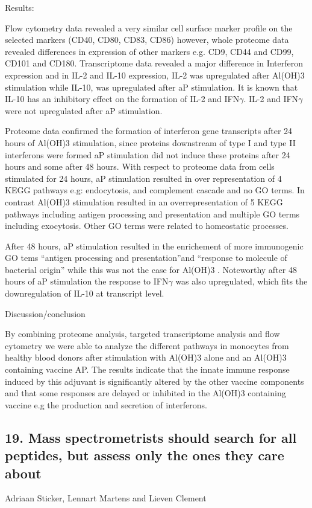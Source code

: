 Results:

Flow cytometry data revealed a very similar cell surface marker profile on the selected markers (CD40, CD80, CD83, CD86) however, whole proteome data revealed differences in expression of other markers e.g. CD9, CD44 and CD99, CD101 and CD180. Transcriptome data revealed a major difference in Interferon expression and in IL-2 and IL-10 expression, IL-2 was upregulated after Al(OH)3 stimulation while IL-10, was upregulated after aP stimulation. It is known that IL-10 has an inhibitory effect on the formation of IL-2 and IFN$\gamma$. IL-2 and IFN$\gamma$ were not upregulated after aP stimulation.

Proteome data confirmed the formation of interferon gene transcripts after 24 hours of Al(OH)3 stimulation, since proteins downstream of type I and type II interferons were formed aP stimulation did not induce these proteins after 24 hours and some after 48 hours. With respect to proteome data from cells stimulated for 24 hours, aP stimulation resulted in over representation of 4 KEGG pathways e.g: endocytosis, and complement cascade and no GO terms. In contrast Al(OH)3 stimulation resulted in an overrepresentation of 5 KEGG pathways including antigen processing and presentation and multiple GO terms including exocytosis. Other GO terms were related to homeostatic processes.

After 48 hours, aP stimulation resulted in the enrichement of more immunogenic GO tems “antigen processing and presentation”and “response to molecule of bacterial origin” while this was not the case for Al(OH)3 . Noteworthy after 48 hours of aP stimulation the response to IFN$\gamma$ was also upregulated, which fits the downregulation of IL-10 at transcript level.


Discussion/conclusion

By combining proteome analysis, targeted transcriptome analysis and flow cytometry we were able to analyze the different pathways in monocytes from healthy blood donors after stimulation with Al(OH)3 alone and an Al(OH)3 containing vaccine AP. The results indicate that the innate immune response induced by this adjuvant is significantly altered by the other vaccine components and that some responses are delayed or inhibited in the Al(OH)3 containing vaccine e.g the production and secretion of interferons.

\subsection*{\color{eubicRed} 19. Mass spectrometrists should search for all peptides, but assess only the ones they care about}
{\color{eubicGray}Adriaan Sticker, Lennart Martens and Lieven Clement}

